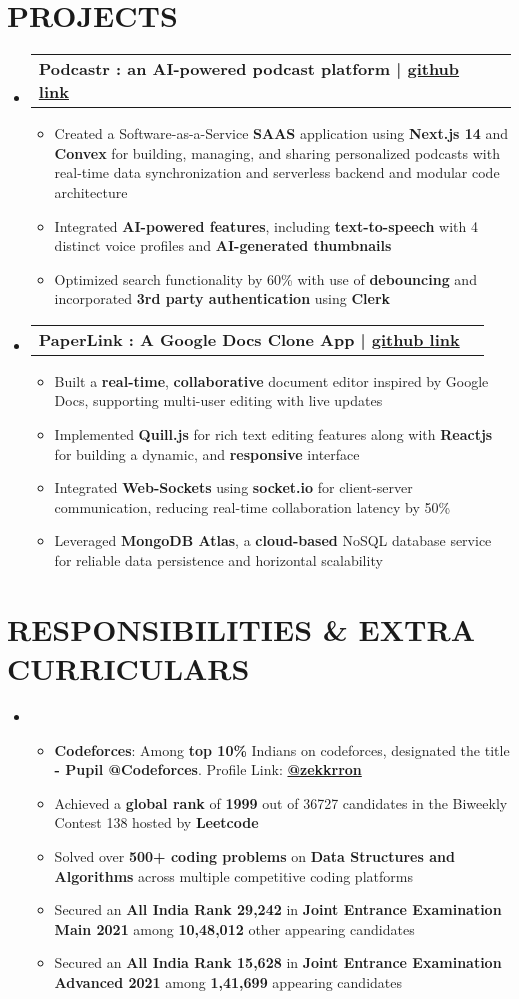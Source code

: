 \documentclass[letterpaper,11pt]{article}
\makeatletter
\newcommand{\cvitem}[1]{
  \item\small{
    {#1\vspace{-2pt}}
  }
}
\newcommand{\cvHeading}[4]{
  \vspace{-2pt}\item
  \begin{tabular*}{\textwidth}[t]{l@{\extracolsep{\fill}}r}
    \textbf{#1} & #2 \\
  \end{tabular*}\vspace{-5pt}
}
\newcommand{\cvHeadingStart}{\begin{itemize}[leftmargin=0in, label={}]}
\newcommand{\cvHeadingEnd}{\end{itemize}}
\newcommand{\cvItemStart}{\begin{itemize}[label=\tiny\textbullet]\justifying}
\newcommand{\cvItemEnd}{\end{itemize}\vspace{-8pt}}
\makeatother
\begin{document}
\section{\textbf{PROJECTS}}
\cvHeadingStart
  \cvHeading
    {Podcastr : an AI-powered podcast platform | \href{https://github.com/zekkrron/Podcastr}{github link}}{}{}{}
  \cvItemStart
    \cvitem{Created a Software-as-a-Service \textbf{SAAS} application using \textbf{Next.js 14} and \textbf{Convex} for building, managing, and sharing personalized podcasts with real-time data synchronization and serverless backend and modular code architecture}
    \cvitem{Integrated \textbf{AI-powered features}, including \textbf{text-to-speech} with 4 distinct voice profiles and \textbf{AI-generated thumbnails}}
    \cvitem{Optimized search functionality by 60\% with use of \textbf{debouncing} and incorporated \textbf{3rd party authentication} using \textbf{Clerk}}
  \cvItemEnd

  \cvHeading
    {PaperLink : A Google Docs Clone App | \href{https://github.com/zekkrron/PaperLink}{github link}}{}{}{}
  \cvItemStart
    \cvitem{Built a \textbf{real-time}, \textbf{collaborative} document editor inspired by Google Docs, supporting multi-user editing with live updates}
    \cvitem{Implemented \textbf{Quill.js} for rich text editing features along with \textbf{Reactjs} for building a dynamic, and \textbf{responsive} interface}
    \cvitem{Integrated \textbf{Web-Sockets} using \textbf{socket.io} for client-server communication, reducing real-time collaboration latency by 50\%}
    \cvitem{Leveraged \textbf{MongoDB Atlas}, a \textbf{cloud-based} NoSQL database service for reliable data persistence and horizontal scalability}
  \cvItemEnd
\cvHeadingEnd

\section{\textbf{RESPONSIBILITIES \& EXTRA CURRICULARS}}
\cvHeadingStart
  \item
  \cvItemStart
    \cvitem{\textbf{Codeforces}: Among \textbf{top 10\%} Indians on codeforces, designated the title \textbf{- Pupil @Codeforces}. Profile Link: \href{https://codeforces.com/profile/zekkrron}{\textbf{@zekkrron}}}
    \cvitem{Achieved a \textbf{global rank} of \textbf{1999} out of 36727 candidates in the Biweekly Contest 138 hosted by \textbf{Leetcode}}
    \cvitem{Solved over \textbf{500+ coding problems} on \textbf{Data Structures and Algorithms} across multiple competitive coding platforms}
    \cvitem{Secured an \textbf{All India Rank 29,242} in \textbf{Joint Entrance Examination Main 2021} among \textbf{10,48,012} other appearing candidates}
    \cvitem{Secured an \textbf{All India Rank 15,628} in \textbf{Joint Entrance Examination Advanced 2021} among \textbf{1,41,699} appearing candidates}
  \cvItemEnd
\cvHeadingEnd
\end{document}
